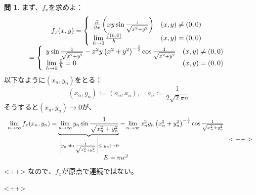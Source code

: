 \documentclass[12pt]{article} %
\theoremstyle{definition}
\newtheorem{question}{問}
\begin{document}
\begin{question}
	まず、$f_x$を求めよ：\begin{equation*}
		\begin{array}[]{c}
			f_x(x,y)=\left\{\begin{array}[]{ll}
				\frac{\partial}{\partial x}\left( xy\sin\frac{1}{\sqrt{x^2+y^2}} \right)&(x,y)\neq(0,0)\\
				\lim_{h\to0}\frac{f(h,0)}{h}&(x,y)=(0,0)
			\end{array}\right.\\
			=\left\{\begin{array}[]{ll}
				y\sin\frac{1}{\sqrt{x^2+y^2}}-x^2y\left( x^2+y^2 \right)^{-\frac{3}{2}}\cos\frac{1}{\sqrt{x^2+y^2}}&(x,y)\neq(0,0)\\
				\lim_{h\to0}\frac{0}{h}=0&(x,y)=(0,0)
			\end{array}\right.
		\end{array}
	\end{equation*}
		以下なように$(x_n,y_n)$をとる：
		\begin{equation*}
			(x_n,y_n):=\left( a_n,a_n \right),\quad a_n:=\frac{1}{2\sqrt{2}\pi n}
		\end{equation*}
		そうすると$(x_n,y_n)\to0$が、
		\begin{equation*}
			\begin{array}[]{c}
				\lim_{n\to\infty}f_x(x_n,y_n)=
				\underbrace{\lim_{n\to\infty}y_n\sin\frac{1}{\sqrt{x_n^2+y_n^2}}}_{\myabs{y_n\sin\frac{1}{\sqrt{x_n^2+y_n^2}}}\le\myabs{y_n}\to0}
				-\lim_{n\to\infty}x_n^2y_n\left( x_n^2+y_n^2 \right)^{-\frac{3}{2}}
				\cos\frac{1}{\sqrt{x_n^2+y_n^2}}\\
				E=mc^2
			\end{array}<++>
		\end{equation*}<++>
		なので、$f_x$が原点で連続ではない。
\end{question}<++>
\end{document}
